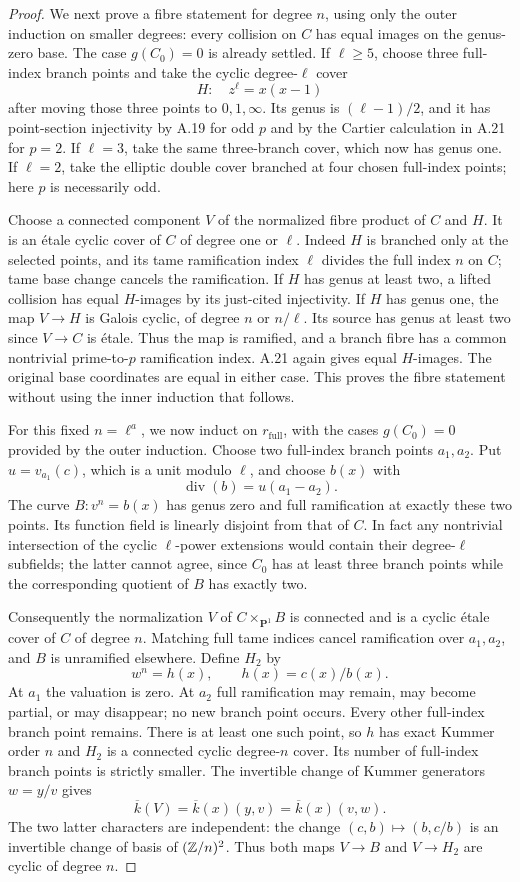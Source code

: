 \begin{proof}
We next prove a fibre statement for degree $n$, using only
the outer induction on smaller degrees: every collision
on $C$ has equal images on the genus-zero base. The case
$g(C_0)=0$ is already settled. If $\ell\ge5$, choose three
full-index branch points and take the cyclic
degree-$\ell$ cover
\[
 H:\quad z^\ell=x(x-1)
\]
after moving those three points to $0,1,\infty$. Its genus
is $(\ell-1)/2$, and it has point-section injectivity by
A.19 for odd $p$ and by the Cartier calculation in A.21
for $p=2$. If $\ell=3$, take the same three-branch cover,
which now has genus one. If $\ell=2$, take the elliptic
double cover branched at four chosen full-index points;
here $p$ is necessarily odd.

Choose a connected component $V$ of the normalized fibre
product of $C$ and $H$. It is an \'etale cyclic cover of
$C$ of degree one or $\ell$. Indeed $H$ is branched only
at the selected points, and its tame ramification index
$\ell$ divides the full index $n$ on $C$; tame base change
cancels the ramification. If $H$ has genus at least two,
a lifted collision has equal $H$-images by its just-cited
injectivity. If $H$ has genus one, the map $V\to H$ is
Galois cyclic, of degree $n$ or $n/\ell$. Its source has
genus at least two since $V\to C$ is \'etale. Thus the
map is ramified, and a branch fibre has a common
nontrivial prime-to-$p$ ramification index. A.21 again
gives equal $H$-images. The original base coordinates are
equal in either case. This proves the fibre statement
without using the inner induction that follows.

For this fixed $n=\ell^a$, we now induct on
$r_{\mathrm{full}}$, with the cases $g(C_0)=0$ provided
by the outer induction. Choose two full-index branch
points $a_1,a_2$. Put $u=v_{a_1}(c)$, which is a unit
modulo $\ell$, and choose $b(x)$ with
\[
 \operatorname{div}(b)=u(a_1-a_2).
\]
The curve $B:v^n=b(x)$ has genus zero and full
ramification at exactly these two points. Its function
field is linearly disjoint from that of $C$. In fact any
nontrivial intersection of the cyclic $\ell$-power
extensions would contain their degree-$\ell$ subfields;
the latter cannot agree, since $C_0$ has at least three
branch points while the corresponding quotient of $B$
has exactly two.

Consequently the normalization $V$ of $C\times_{\mathbf
P^1}B$ is connected and is a cyclic \'etale cover of $C$
of degree $n$. Matching full tame indices cancel
ramification over $a_1,a_2$, and $B$ is unramified
elsewhere. Define $H_2$ by
\[
 w^n=h(x),\qquad h(x)=c(x)/b(x).
\]
At $a_1$ the valuation is zero. At $a_2$ full ramification
may remain, may become partial, or may disappear; no new
branch point occurs. Every other full-index branch point
remains. There is at least one such point, so $h$ has
exact Kummer order $n$ and $H_2$ is a connected cyclic
degree-$n$ cover. Its number of full-index branch points
is strictly smaller. The invertible change of Kummer
generators $w=y/v$ gives
\[
 \overline k(V)=\overline k(x)(y,v)
              =\overline k(x)(v,w).                       \tag{A.15}
\]
The two latter characters are independent: the change
$(c,b)\mapsto(b,c/b)$ is an invertible change of basis of
$(\mathbb Z/n)^2$. Thus both maps $V\to B$ and $V\to H_2$ are
cyclic of degree $n$.


\end{proof}
